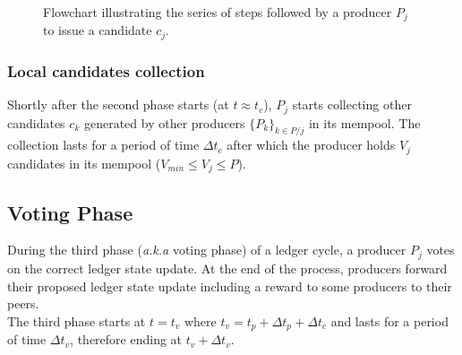 \begin{enumerate}
\begin{figure}[H]
\label{fig:computation}
\caption{\label{fig:computation} Flowchart illustrating the series of steps followed by a producer $P_j$ to issue a candidate $c_j$.}
\end{figure}
\end{enumerate}

\subsubsection{Local candidates collection}
Shortly after the second phase starts (at $t \approx t_c$), $P_j$ starts collecting other candidates $c_{k}$ generated by other producers $\{P_k\}_{k \in P/j}$ in its mempool. The collection lasts for a period of time $\Delta t_{c}$ after which the producer holds $V_j$ candidates in its mempool ($V_{min} \leq V_j \leq P$). 

\subsection{Voting Phase}

During the third phase (\textit{a.k.a} voting phase) of a ledger cycle, a producer $P_j$ votes on the correct ledger state update. At the end of the process, producers forward their proposed ledger state update including a reward to some producers to their peers. \\

The third phase starts at $t = t_v$ where $t_v = t_p + \Delta t_{p} + \Delta t_{c}$ and lasts for a period of time $\Delta t_{v}$, therefore ending at $t_v+\Delta t_{v}$.


